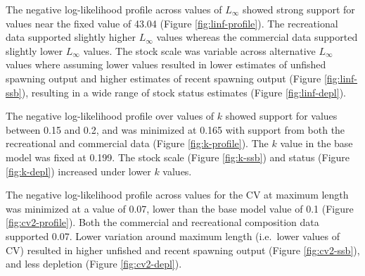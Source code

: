 \documentclass[11pt,
  english,
  a4paper,
]{article}
\begin{document}
\leavevmode\tagmcend\tagstructend\par


The negative log-likelihood profile across values of {\(L_{\infty}\)\leavevmode\tagmcend\tagstructend} showed strong support for values near the fixed value of 43.04 (Figure \ref{fig:linf-profile}). The recreational data supported slightly higher {\(L_{\infty}\)\leavevmode\tagmcend\tagstructend} values whereas the commercial data supported slightly lower {\(L_{\infty}\)\leavevmode\tagmcend\tagstructend} values. The stock scale was variable across alternative {\(L_{\infty}\)\leavevmode\tagmcend\tagstructend} values where assuming lower values resulted in lower estimates of unfished spawning output and higher estimates of recent spawning output (Figure \ref{fig:linf-ssb}), resulting in a wide range of stock status estimates (Figure \ref{fig:linf-depl}).

\leavevmode\tagmcend\tagstructend\par


The negative log-likelihood profile over values of {\(k\)\leavevmode\tagmcend\tagstructend} showed support for values between 0.15 and 0.2, and was minimized at 0.165 with support from both the recreational and commercial data (Figure \ref{fig:k-profile}). The {\(k\)\leavevmode\tagmcend\tagstructend} value in the base model was fixed at 0.199. The stock scale (Figure \ref{fig:k-ssb}) and status (Figure \ref{fig:k-depl}) increased under lower {\(k\)\leavevmode\tagmcend\tagstructend} values.

\leavevmode\tagmcend\tagstructend\par


The negative log-likelihood profile across values for the CV at maximum length was minimized at a value of 0.07, lower than the base model value of 0.1 (Figure \ref{fig:cv2-profile}). Both the commercial and recreational composition data supported 0.07. Lower variation around maximum length (i.e.~lower values of CV) resulted in higher unfished and recent spawning output (Figure \ref{fig:cv2-ssb}), and less depletion (Figure \ref{fig:cv2-depl}).
\end{document}
